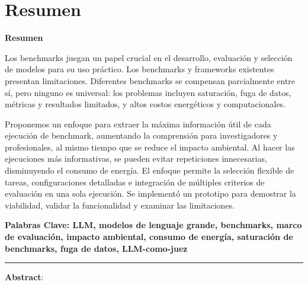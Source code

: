 
%
\makeatletter
\renewenvironment{abstract}{%
    \if@twocolumn
      \section*{Resumen \\}%
    \else %
    \begin{flushright}
        {\filleft\Huge\bfseries\fontsize{48pt}{12}\selectfont Resumen\vspace{\z@}}%
        \end{flushright}
      \quotation
    \fi}
    {\if@twocolumn\else\endquotation\fi}
\makeatother
\begin{abstract}

Los benchmarks juegan un papel crucial en el desarrollo, evaluación y selección de modelos para su uso práctico. Los benchmarks y frameworks existentes presentan limitaciones. Diferentes benchmarks se compensan parcialmente entre sí, pero ninguno es universal: los problemas incluyen saturación, fuga de datos, métricas y resultados limitados, y altos costos energéticos y computacionales.


Proponemos un enfoque para extraer la máxima información útil de cada ejecución de benchmark, aumentando la comprensión para investigadores y profesionales, al mismo tiempo que se reduce el impacto ambiental. Al hacer las ejecuciones más informativas, se pueden evitar repeticiones innecesarias, disminuyendo el consumo de energía. El enfoque permite la selección flexible de tareas, configuraciones detalladas e integración de múltiples criterios de evaluación en una sola ejecución. Se implementó un prototipo para demostrar la viabilidad, validar la funcionalidad y examinar las limitaciones.



\bfseries{\large{Palabras Clave:}} LLM, modelos de lenguaje grande, benchmarks, marco de evaluación, impacto ambiental, consumo de energía, saturación de benchmarks, fuga de datos, LLM-como-juez


\vspace{1cm}
\begin{center}
  \rule{0.5\textwidth}{.4pt}
\end{center}
\vspace{1cm}


\newpage
\textbf{Abstract}:


\end{abstract}
